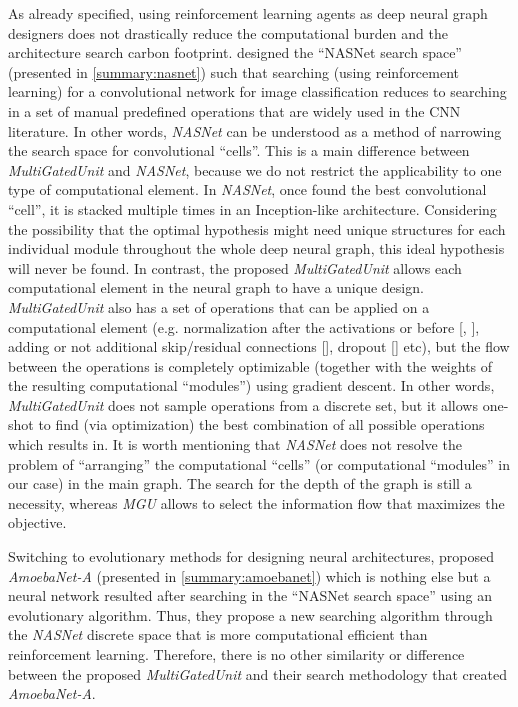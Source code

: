 \documentclass[11pt,a4paper]{article}
\begin{document}
As already specified, using reinforcement learning agents  as  deep  neural  graph  designers  does  not drastically reduce the computational burden and the architecture search carbon footprint. \citet{Zoph2018} designed the “NASNet search space” (presented in \ref{summary:nasnet}) such that searching (using reinforcement learning) for a convolutional network for image classification reduces to searching in a set of manual predefined operations that are widely used in the CNN literature. In other words, \textit{NASNet} can be understood as a method of narrowing the search space for convolutional “cells''. This is a main difference between \textit{MultiGatedUnit} and \textit{NASNet}, because we do not restrict the applicability to one type of computational element. In \textit{NASNet}, once found the best convolutional “cell”, it is stacked multiple times in an Inception-like architecture. Considering the possibility that the optimal hypothesis might need unique structures for each individual module throughout the whole deep neural graph, this ideal hypothesis will never be found. In contrast, the proposed \textit{MultiGatedUnit} allows each computational element in the neural graph to have a unique design.  \textit{MultiGatedUnit} also has a set of operations that can be applied on a computational element (e.g. normalization after the activations or before [\citet{Ioffe2015}, \citet{ba2016layer}], adding or not additional skip/residual connections [\citet{He2016}], dropout [\citet{Srivastava2014}] etc), but the flow between the operations is completely optimizable (together with the weights of the resulting computational “modules”) using gradient descent. In other words, \textit{MultiGatedUnit} does not sample operations from a discrete set, but it allows one-shot to find (via optimization) the best combination of all possible operations which results in. It is worth mentioning that \textit{NASNet} does not resolve the problem of “arranging” the computational “cells” (or computational “modules” in our case) in the main graph. The search for the depth of the graph is still a necessity, whereas \textit{MGU} allows to select the information flow that maximizes the objective. 

Switching to evolutionary methods for designing neural architectures, \citet{Real2018} proposed \textit{AmoebaNet-A} (presented in \ref{summary:amoebanet}) which is nothing else but a neural network resulted after searching in the “NASNet search space” using an evolutionary algorithm. Thus, they propose a new searching algorithm through the \textit{NASNet} discrete space that is more computational efficient than reinforcement learning. Therefore, there is no other similarity or difference between the proposed \textit{MultiGatedUnit} and their search methodology that created \textit{AmoebaNet-A}.
\end{document}
